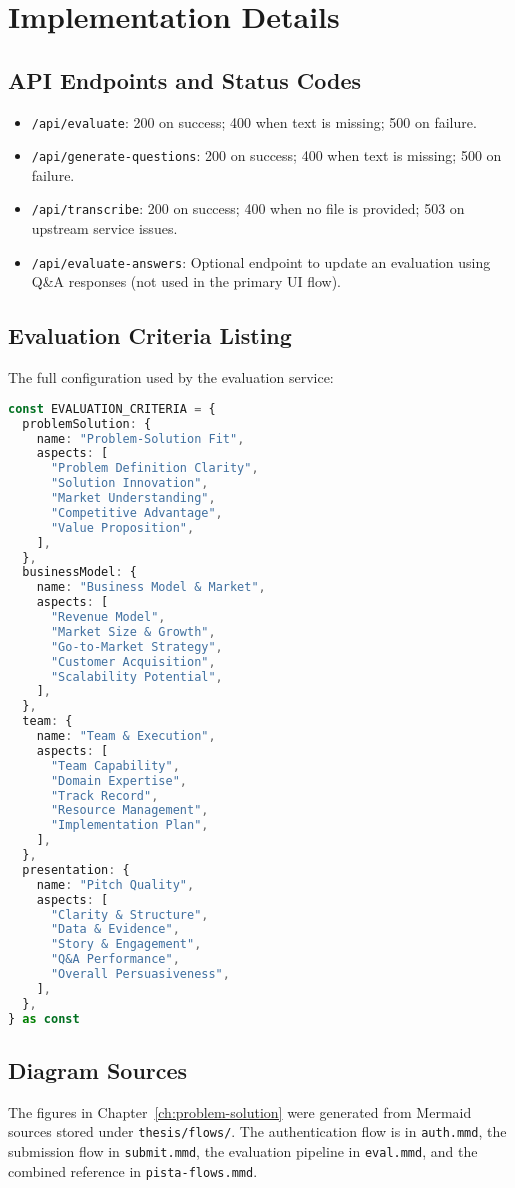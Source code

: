 \chapter{Implementation Details}

\section{API Endpoints and Status Codes}
\begin{itemize}
  \item \texttt{/api/evaluate}: 200 on success; 400 when text is missing; 500 on failure.
  \item \texttt{/api/generate-questions}: 200 on success; 400 when text is missing; 500 on failure.
  \item \texttt{/api/transcribe}: 200 on success; 400 when no file is provided; 503 on upstream service issues.
  \item \texttt{/api/evaluate-answers}: Optional endpoint to update an evaluation using Q\&A responses (not used in the primary UI flow).
\end{itemize}

\section{Evaluation Criteria Listing}
The full configuration used by the evaluation service:

\begin{lstlisting}[language=TypeScript, caption={Core evaluation criteria (reference)}]
const EVALUATION_CRITERIA = {
  problemSolution: {
    name: "Problem-Solution Fit",
    aspects: [
      "Problem Definition Clarity",
      "Solution Innovation",
      "Market Understanding",
      "Competitive Advantage",
      "Value Proposition",
    ],
  },
  businessModel: {
    name: "Business Model & Market",
    aspects: [
      "Revenue Model",
      "Market Size & Growth",
      "Go-to-Market Strategy",
      "Customer Acquisition",
      "Scalability Potential",
    ],
  },
  team: {
    name: "Team & Execution",
    aspects: [
      "Team Capability",
      "Domain Expertise",
      "Track Record",
      "Resource Management",
      "Implementation Plan",
    ],
  },
  presentation: {
    name: "Pitch Quality",
    aspects: [
      "Clarity & Structure",
      "Data & Evidence",
      "Story & Engagement",
      "Q&A Performance",
      "Overall Persuasiveness",
    ],
  },
} as const
\end{lstlisting}

\section{Diagram Sources}
The figures in Chapter~\ref{ch:problem-solution} were generated from Mermaid sources stored under \texttt{thesis/flows/}. The authentication flow is in \texttt{auth.mmd}, the submission flow in \texttt{submit.mmd}, the evaluation pipeline in \texttt{eval.mmd}, and the combined reference in \texttt{pista-flows.mmd}.


